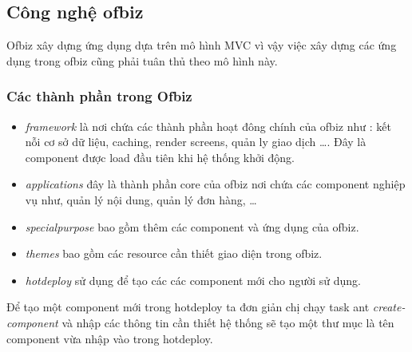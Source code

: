 \documentclass[a4paper,12pt]{report}
\begin{document}
\subsection{Công nghệ ofbiz}
Ofbiz xây dựng ứng dụng dựa trên mô hình MVC vì vậy việc xây dựng các ứng dụng trong ofbiz cũng phải tuân thủ theo mô hình này. 	
\subsubsection{Các thành phần trong Ofbiz}
\begin{itemize}
\item \textit{framework} là nơi chứa các thành phần hoạt đông chính của ofbiz như : kết nỗi cơ sở dữ liệu, caching, render screens, quản ly giao dịch \ldots. Đây là component được load đầu tiên khi hệ thống khởi động.
\item \textit{applications} đây là thành phần core của ofbiz nơi chứa các component nghiệp vụ như, quản lý nội dung, quản lý đơn hàng, \ldots

\item \textit{specialpurpose} bao gồm thêm các component và ứng dụng của ofbiz.
\item \textit{themes} bao gồm các resource cần thiết giao diện trong ofbiz.
\item \textit{hotdeploy} sử dụng để tạo các các component mới cho người sử dụng.
\end{itemize}
Để tạo một component mới trong hotdeploy ta đơn giản chị chạy task ant \textit{create-component} và nhập các thông tin cần thiết hệ thống sẽ tạo một thư mục là tên component vừa nhập vào trong hotdeploy. \\
\end{document}
